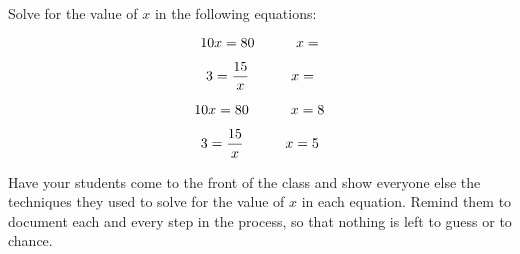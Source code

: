 

Solve for the value of $x$ in the following equations:

$$10x = 80 \hbox{\hskip 30pt} x = $$

\vskip 10pt

$$3 = {15 \over x} \hbox{\hskip 30pt} x = $$







$$10x = 80 \hbox{\hskip 30pt} x = 8$$

$$3 = {15 \over x} \hbox{\hskip 30pt} x = 5$$







Have your students come to the front of the class and show everyone else the techniques they used to solve for the value of $x$ in each equation.  Remind them to document each and every step in the process, so that nothing is left to guess or to chance.




